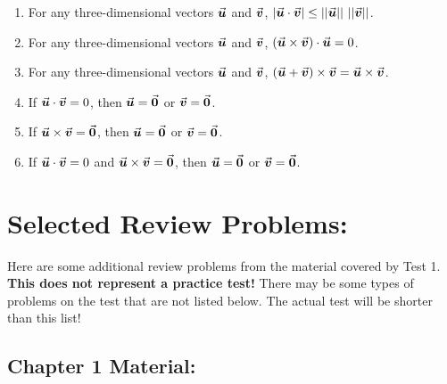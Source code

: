 \begin{enumerate}
\item For any three-dimensional vectors \(\u\) and \(\v\), \(|\u\cdot \v| \leq ||\u||\  ||\v||\). \label{TFE12}%
\vfill

\item For any three-dimensional vectors \(\u\) and \(\v\), \((\u \times \v) \cdot \u = 0\). \label{TFE10-13}%
\vfill

\item For any three-dimensional vectors \(\u\) and \(\v\), \((\u + \v) \times \v = \u \times \v\). \label{TFE10-14}%
\vfill

\item If \(\u\cdot \v=0\), then \(\u=\vec{0}\) or \(\v=\vec{0}\). \label{TFE11}%
\vfill

\item If \(\u \times \v = \vec{0}\), then \(\u=\vec{0}\) or \(\v = \vec{0}\). \label{TFE10-20}%
\vfill

\item If \(\u \cdot \v = 0\) and \(\u \times \v = \vec{0}\), then \(\u=\vec{0}\) or \(\v = \vec{0}\). \label{TFE10-21}%
\vfill

\end{enumerate}

\pagebreak

\section*{Selected Review Problems:}
Here are some additional review problems from the material covered by Test 1.  \textbf{This does not represent a practice test!} There may be some types of problems on the test that are not listed below. The actual test will  be shorter than this list!




\subsection*{Chapter 1 Material:}

